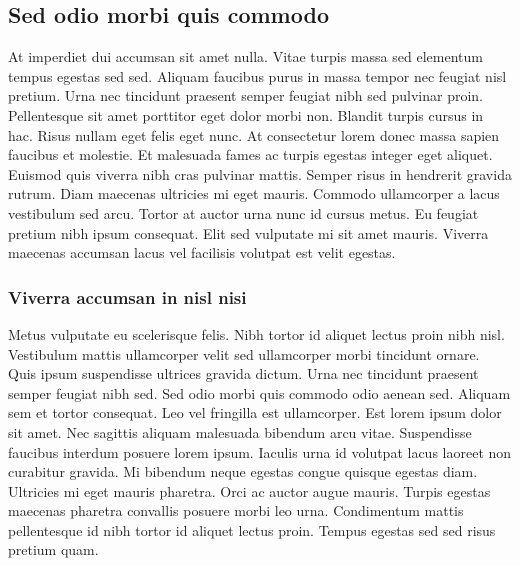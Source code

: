 \documentclass{article}
\begin{document}
    \subsection{Sed odio morbi quis commodo}

    At imperdiet dui accumsan sit amet nulla. Vitae turpis massa sed elementum tempus egestas sed sed. Aliquam faucibus purus in massa tempor nec feugiat nisl pretium. Urna nec tincidunt praesent semper feugiat nibh sed pulvinar proin. Pellentesque sit amet porttitor eget dolor morbi non. Blandit turpis cursus in hac. Risus nullam eget felis eget nunc. At consectetur lorem donec massa sapien faucibus et molestie. Et malesuada fames ac turpis egestas integer eget aliquet. Euismod quis viverra nibh cras pulvinar mattis. Semper risus in hendrerit gravida rutrum. Diam maecenas ultricies mi eget mauris. Commodo ullamcorper a lacus vestibulum sed arcu. Tortor at auctor urna nunc id cursus metus. Eu feugiat pretium nibh ipsum consequat. Elit sed vulputate mi sit amet mauris. Viverra maecenas accumsan lacus vel facilisis volutpat est velit egestas.

    \subsubsection{Viverra accumsan in nisl nisi}

    Metus vulputate eu scelerisque felis. Nibh tortor id aliquet lectus proin nibh nisl. Vestibulum mattis ullamcorper velit sed ullamcorper morbi tincidunt ornare. Quis ipsum suspendisse ultrices gravida dictum. Urna nec tincidunt praesent semper feugiat nibh sed. Sed odio morbi quis commodo odio aenean sed. Aliquam sem et tortor consequat. Leo vel fringilla est ullamcorper. Est lorem ipsum dolor sit amet. Nec sagittis aliquam malesuada bibendum arcu vitae. Suspendisse faucibus interdum posuere lorem ipsum. Iaculis urna id volutpat lacus laoreet non curabitur gravida. Mi bibendum neque egestas congue quisque egestas diam. Ultricies mi eget mauris pharetra. Orci ac auctor augue mauris. Turpis egestas maecenas pharetra convallis posuere morbi leo urna. Condimentum mattis pellentesque id nibh tortor id aliquet lectus proin. Tempus egestas sed sed risus pretium quam.
\end{document}
